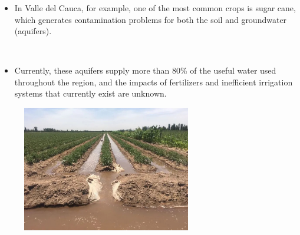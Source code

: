\begin{frame}
	\frametitle{\secname}
	\begin{minipage}{0.5\textwidth}
		\begin{itemize}
			\item In Valle del Cauca, for example, one of the most
			      common crops is sugar cane, which generates contamination
			      problems for both the soil and groundwater (\alert{aquifers}).

			      \

			\item Currently, these aquifers supply more than
			      \alert{80\% of the useful water} used throughout the
			      region, and the impacts of fertilizers and inefficient
			      irrigation systems that currently exist are unknown.

		\end{itemize}
	\end{minipage}
	\begin{minipage}{0.47\textwidth}
		\begin{figure}[ht!]
			\centering
			\includegraphics[height=5.5cm]{water_waster2}
		\end{figure}
	\end{minipage}
\end{frame}
